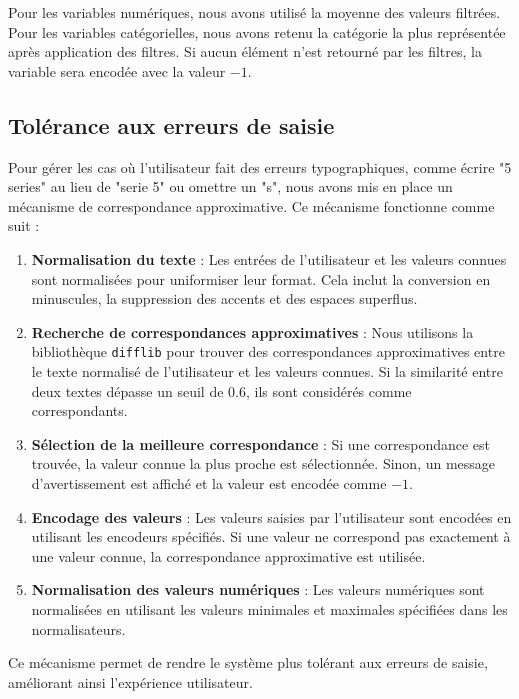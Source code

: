 \documentclass[12pt]{report}
\begin{document}
Pour les variables numériques, nous avons utilisé la moyenne des valeurs filtrées. Pour les variables catégorielles, nous avons retenu la catégorie la plus représentée après application des filtres. Si aucun élément n'est retourné par les filtres, la variable sera encodée avec la valeur \(-1\).


\subsection{Tolérance aux erreurs de saisie}

Pour gérer les cas où l'utilisateur fait des erreurs typographiques, comme écrire "5 series" au lieu de "serie 5" ou omettre un "s", nous avons mis en place un mécanisme de correspondance approximative. Ce mécanisme fonctionne comme suit :

\begin{enumerate}
    \item \textbf{Normalisation du texte} : Les entrées de l'utilisateur et les valeurs connues sont normalisées pour uniformiser leur format. Cela inclut la conversion en minuscules, la suppression des accents et des espaces superflus.
    \item \textbf{Recherche de correspondances approximatives} : Nous utilisons la bibliothèque \texttt{difflib} pour trouver des correspondances approximatives entre le texte normalisé de l'utilisateur et les valeurs connues. Si la similarité entre deux textes dépasse un seuil de 0.6, ils sont considérés comme correspondants.
    \item \textbf{Sélection de la meilleure correspondance} : Si une correspondance est trouvée, la valeur connue la plus proche est sélectionnée. Sinon, un message d'avertissement est affiché et la valeur est encodée comme \(-1\).
    \item \textbf{Encodage des valeurs} : Les valeurs saisies par l'utilisateur sont encodées en utilisant les encodeurs spécifiés. Si une valeur ne correspond pas exactement à une valeur connue, la correspondance approximative est utilisée.
    \item \textbf{Normalisation des valeurs numériques} : Les valeurs numériques sont normalisées en utilisant les valeurs minimales et maximales spécifiées dans les normalisateurs.
\end{enumerate}

Ce mécanisme permet de rendre le système plus tolérant aux erreurs de saisie, améliorant ainsi l'expérience utilisateur.
\end{document}
